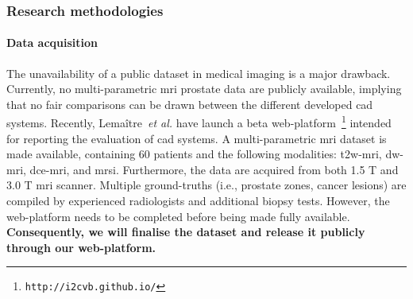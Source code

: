
\subsubsection{Research methodologies}
\label{sec:methodologies}

\paragraph{Data acquisition}

The unavailability of a public dataset in medical imaging is a major drawback.
Currently, no multi-parametric \ac{mri} prostate data are publicly available, implying that no fair comparisons can be drawn between the different developed \ac{cad} systems.
Recently, Lema\^itre~\emph{et al.} have launch a beta web-platform~\footnote{\texttt{http://i2cvb.github.io/}} intended for reporting the evaluation of \ac{cad} systems.
A multi-parametric \ac{mri} dataset is made available, containing 60 patients and the following modalities: \ac{t2w}-\ac{mri}, \ac{dw}-\ac{mri}, \ac{dce}-\ac{mri}, and \ac{mrsi}.
Furthermore, the data are acquired from both 1.5 T and 3.0 T \ac{mri} scanner.
Multiple ground-truths (i.e., prostate zones, cancer lesions) are compiled by experienced radiologists and additional biopsy tests.
However, the web-platform needs to be completed before being made fully available.
\textbf{Consequently, we will finalise the dataset and release it publicly through our web-platform.}

